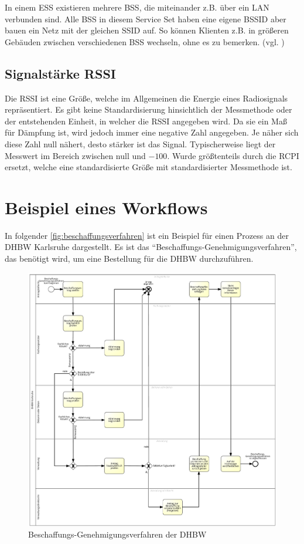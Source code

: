 In einem \gls{ESS} existieren mehrere \gls{BSS}, die miteinander z.B. über ein \gls{LAN} verbunden sind.
Alle \gls{BSS} in diesem Service Set haben eine eigene \gls{BSSID} aber bauen ein Netz mit der gleichen \gls{SSID} auf.
So können Klienten z.B. in größeren Gebäuden zwischen verschiedenen \gls{BSS} wechseln, ohne es zu bemerken.
(vgl. \cite{Haider2019})

\subsection{Signalstärke \gls{RSSI}}

Die \gls{RSSI} ist eine Größe, welche im Allgemeinen die Energie eines Radiosignals repräsentiert.
Es gibt keine Standardisierung hinsichtlich der Messmethode oder der entstehenden Einheit, in
welcher die \gls{RSSI} angegeben wird. Da sie ein Maß für Dämpfung ist, wird jedoch immer eine
negative Zahl angegeben. Je näher sich diese Zahl null nähert, desto stärker ist das Signal.
Typischerweise liegt der Messwert im Bereich zwischen null und $-100$.
Wurde größtenteils durch die \gls{RCPI} ersetzt, welche eine standardisierte Größe mit
standardisierter Messmethode ist.


\section{Beispiel eines Workflows}

In folgender \autoref{fig:beschaffungsverfahren} ist ein Beispiel für einen Prozess an der \gls{DHBW} Karlsruhe dargestellt.
Es ist das \enquote{Beschaffungs-Genehmigungsverfahren}, das benötigt wird, um eine Bestellung für die \gls{DHBW} durchzuführen.

\begin{figure}
	\includegraphics[width=\textwidth]{images/beschaffungs-genehmigungsverfahren.png}
	\centering
	\caption{Beschaffungs-Genehmigungsverfahren der \gls{DHBW}}
	\label{fig:beschaffungsverfahren}
\end{figure}

